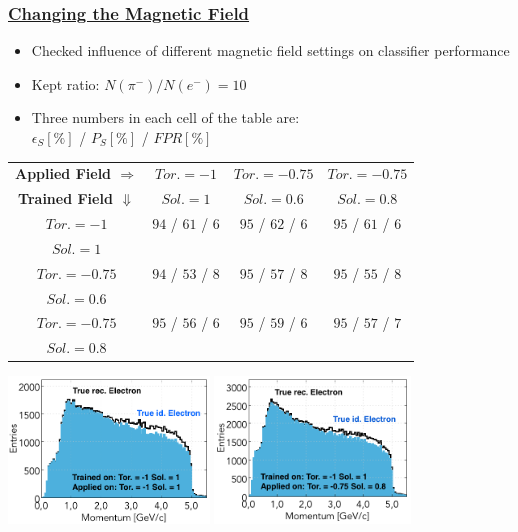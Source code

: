 \documentclass[xcolor=table, xcolor=dvipsnames]{beamer}
\begin{document}

\begin{frame}
  \frametitle{\hyperlink{con}{Changing the Magnetic Field}}
  \label{mField}
  \scriptsize
  
  \begin{itemize}
    \item Checked influence of different magnetic field settings on classifier performance
    \item Kept ratio: $N(\pi^-) / N(e^-) = 10$
    \item Three numbers in each cell of the table are:
    \\$\epsilon_S [\%]$  / $P_S [\%]$ / $FPR [\%]$
  \end{itemize}
  
  \begin{table}
     \scriptsize
    \begin{tabular}{c||c|c|c}
 
      {\bf Applied Field $\Rightarrow$}  & $Tor. =-1$  &  $Tor. =-0.75$ &  $Tor. =-0.75$  \\
      {\bf Trained Field $\Downarrow$} & $Sol. =1$ &   $Sol. =0.6$ &  $Sol. =0.8$ \\
      \hline
      \hline
       $Tor. =-1$ &  $94$ / $61$ / $6$  &  $95$ / $62$ / $6$  & $95$ / $61$ / $6$ \\
       $Sol. =1$ &    &    & \\
       \hline 
        $Tor. =-0.75$ &  $94$ / $53$ / $8$  &  $95$ / $57$ / $8$  & $95$ / $55$ / $8$ \\
         $Sol. =0.6$ &   &   & \\
        \hline
         $Tor. =-0.75$  &  $95$ / $56$ / $6$  &  $95$ / $59$ / $6$  & $95$ / $57$ / $7$ \\
          $Sol. =0.8$ &   &   & \\
    \end{tabular}
  \end{table}
  
\includegraphics[width=0.4\textwidth,origin=l]{pidMLP_HL85V123456N6000R1_trueMomentum.png}
\includegraphics[width=0.39\textwidth,origin=r]{pidMLP_T-1S1_trueT-075S08Momentum.png}

  
\end{frame}
\end{document}
